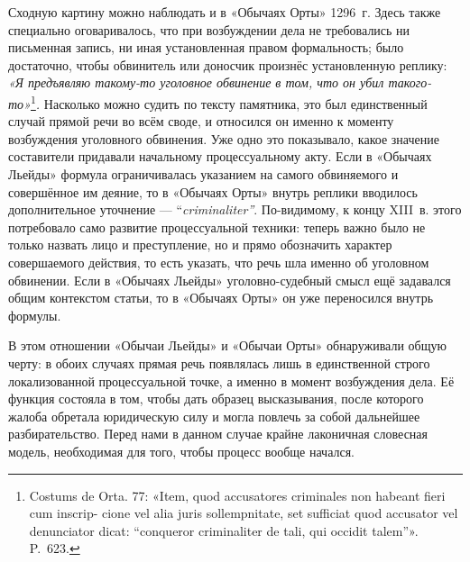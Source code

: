 Сходную картину можно наблюдать и в «Обычаях Орты» 1296~г. Здесь также специально оговаривалось, что при возбуждении дела не требовались ни письменная запись, ни иная установленная правом формальность; было достаточно, чтобы обвинитель или доносчик произнёс установленную реплику: \emph{«Я предъявляю такому-то уголовное обвинение в том, что он убил такого-то»}\footnote{Costums de Orta. 77: «Item, quod accusatores criminales non habeant fieri cum inscrip- cione vel alia juris sollempnitate, set sufficiat quod accusator vel denunciator dicat: “conqueror criminaliter de tali, qui occidit talem”». P.~623.}\emph{. }Насколько можно судить по тексту памятника, это был единственный случай прямой речи во всём своде, и относился он именно к моменту возбуждения уголовного обвинения. Уже одно это показывало, какое значение составители придавали начальному процессуальному акту. Если в «Обычаях Льейды» формула ограничивалась указанием на самого обвиняемого и совершённое им деяние, то в «Обычаях Орты» внутрь реплики вводилось дополнительное уточнение --- “\emph{criminaliter”}. По-видимому, к концу XIII~в. этого потребовало само развитие процессуальной техники: теперь важно было не только назвать лицо и преступление, но и прямо обозначить характер совершаемого действия, то есть указать, что речь шла именно об уголовном обвинении. Если в «Обычаях Льейды» уголовно-судебный смысл ещё задавался общим контекстом статьи, то в «Обычаях Орты» он уже переносился внутрь формулы.

В этом отношении «Обычаи Льейды» и «Обычаи Орты» обнаруживали общую черту: в обоих случаях прямая речь появлялась лишь в единственной строго локализованной процессуальной точке, а именно в момент возбуждения дела. Её функция состояла в том, чтобы дать образец высказывания, после которого жалоба обретала юридическую силу и могла повлечь за собой дальнейшее разбирательство. Перед нами в данном случае крайне лаконичная словесная модель, необходимая для того, чтобы процесс вообще начался.

